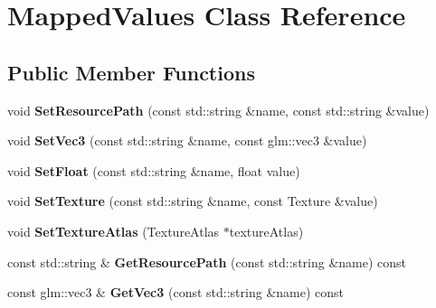 \hypertarget{class_mapped_values}{}\section{Mapped\+Values Class Reference}
\label{class_mapped_values}
\subsection*{Public Member Functions}
\begin{DoxyCompactItemize}
\item 
\hypertarget{class_mapped_values_ad92059b3359c801411f546e0e711efe7}{}void {\bfseries Set\+Resource\+Path} (const std\+::string \&name, const std\+::string \&value)\label{class_mapped_values_ad92059b3359c801411f546e0e711efe7}

\item 
\hypertarget{class_mapped_values_a13fa77709f5e7135e9819919102e83bd}{}void {\bfseries Set\+Vec3} (const std\+::string \&name, const glm\+::vec3 \&value)\label{class_mapped_values_a13fa77709f5e7135e9819919102e83bd}

\item 
\hypertarget{class_mapped_values_a44ae7ea73b6c2516fdd7fb0dce574300}{}void {\bfseries Set\+Float} (const std\+::string \&name, float value)\label{class_mapped_values_a44ae7ea73b6c2516fdd7fb0dce574300}

\item 
\hypertarget{class_mapped_values_aa77284d7ea440391c052bde41996a2a3}{}void {\bfseries Set\+Texture} (const std\+::string \&name, const Texture \&value)\label{class_mapped_values_aa77284d7ea440391c052bde41996a2a3}

\item 
\hypertarget{class_mapped_values_afd68ad8264b593f64b184f5f124dc8e4}{}void {\bfseries Set\+Texture\+Atlas} (Texture\+Atlas $\ast$texture\+Atlas)\label{class_mapped_values_afd68ad8264b593f64b184f5f124dc8e4}

\item 
\hypertarget{class_mapped_values_a20badbf7055511b9308c4dd2d2f1a919}{}const std\+::string \& {\bfseries Get\+Resource\+Path} (const std\+::string \&name) const \label{class_mapped_values_a20badbf7055511b9308c4dd2d2f1a919}

\item 
\hypertarget{class_mapped_values_a68a7911a86319dfa6346bfd9c0f5b7f9}{}const glm\+::vec3 \& {\bfseries Get\+Vec3} (const std\+::string \&name) const \label{class_mapped_values_a68a7911a86319dfa6346bfd9c0f5b7f9}


\end{DoxyCompactItemize}

